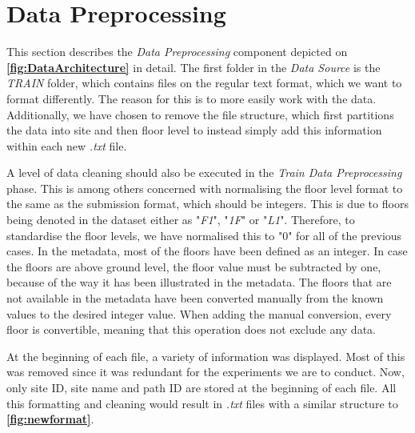 \section{Data Preprocessing}
\label{sec:dataPreprocessing}
This section describes the \textit{Data Preprocessing} component depicted on \textbf{\autoref{fig:DataArchitecture}} in detail. The first folder in the \textit{Data Source} is the \textit{TRAIN} folder, which contains files on the regular text format, which we want to format differently. The reason for this is to more easily work with the data. Additionally, we have chosen to remove the file structure, which first partitions the data into site and then floor level to instead simply add this information within each new \textit{.txt} file.

A level of data cleaning should also be executed in the \textit{Train Data Preprocessing} phase. This is among others concerned with normalising the floor level format to the same as the submission format, which should be integers. This is due to floors being denoted in the dataset either as "\textit{F1}", "\textit{1F}" or "\textit{L1}". Therefore, to standardise the floor levels, we have normalised this to "0" for all of the previous cases. In the metadata, most of the floors have been defined as an integer. In case the floors are above ground level, the floor value must be subtracted by one, because of the way it has been illustrated in the metadata. The floors that are not available in the metadata have been converted manually from the known values to the desired integer value. When adding the manual conversion, every floor is convertible, meaning that this operation does not exclude any data.


At the beginning of each file, a variety of information was displayed. Most of this was removed since it was redundant for the experiments we are to conduct. Now, only site ID, site name and path ID are stored at the beginning of each file. All this formatting and cleaning would result in \textit{.txt} files with a similar structure to \textbf{\autoref{fig:newformat}}.

